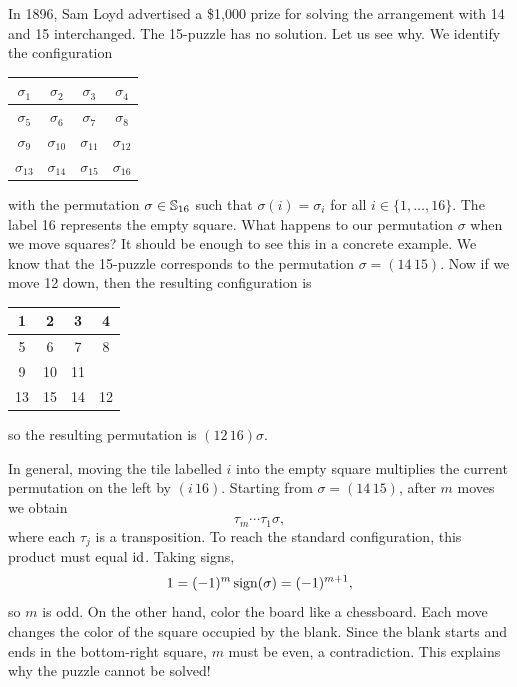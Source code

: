 In 1896, Sam Loyd advertised a \$1,000 prize for solving the arrangement with 14 and 15 interchanged.
The 15-puzzle has no solution. Let us see why.
We identify the configuration 
\bigskip 
    \begin{center}
        \begin{tabular}{|c|c|c|c|}
            \hline
            $\sigma_1$ & $\sigma_2$ & $\sigma_3$ & $\sigma_4$\\
            \hline
            $\sigma_5$ & $\sigma_6$ & $\sigma_7$ & $\sigma_8$\\
            \hline
            $\sigma_9$ & $\sigma_{10}$ & $\sigma_{11}$ & $\sigma_{12}$\\
            \hline
            $\sigma_{13}$ & $\sigma_{14}$ & $\sigma_{15}$ & $\sigma_{16}$\\
            \hline
        \end{tabular}
    \end{center}
\bigskip 
with the permutation $\sigma\in\mathbb{S}_{16}$ such that  
$\sigma(i)=\sigma_i$ for all $i\in\{1,\dots,16\}$. The label 16 represents 
the empty square. What happens to our permutation 
$\sigma$ when we move squares? It should be enough to see 
this in a concrete example. We know that the 15-puzzle corresponds to the 
permutation $\sigma=(14\,15)$. Now if 
we move 12 down, then the resulting 
configuration is 
\bigskip 
    \begin{center}
        \begin{tabular}{|c|c|c|c|}
            \hline
            1 & 2 & 3 & 4\\
            \hline
            5 & 6 & 7 & 8\\
            \hline
            9 & 10 & 11 & \\
            \hline
            13 & 15 & 14 & 12\\
            \hline
        \end{tabular}
    \end{center}
\bigskip 
so the resulting permutation 
is $(12\,16)\sigma$.

In general, moving the tile labelled $i$ into the empty square
multiplies the current permutation on the left by $(i\,16)$.
Starting from $\sigma=(14\,15)$, after $m$ moves we obtain 
\[
\tau_m\cdots\tau_1\sigma,
\]
where each $\tau_j$ is a transposition.
To reach the standard configuration, this product must equal
$\operatorname{id}$. Taking signs, 
\[
1=(-1)^m\operatorname{sign}(\sigma)=(-1)^{m+1},
\]
so $m$ is odd.
On the other hand, color the board like a chessboard.
Each move changes the color of the square occupied by the blank.
Since the blank starts and ends in the bottom-right square,
$m$ must be even, a contradiction. This explains why the puzzle cannot
be solved! 

